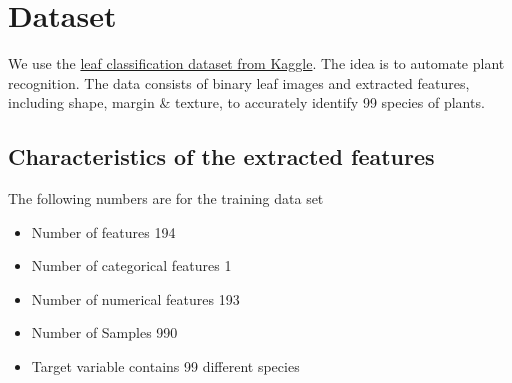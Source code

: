\documentclass{sig-alternate-05-2015}
\begin{document}
%
\author{
%
%
\alignauthor
Stefan Beyer\\
       \\
\alignauthor
Georg Heiler\\
       \\
}
\date{30 July 1999}

\maketitle

\section{Dataset}
We use the \href{https://www.kaggle.com/c/leaf-classification}{leaf classification dataset from Kaggle}. The idea is to automate plant recognition. The data consists of binary leaf images and extracted features, including shape, margin \& texture, to accurately identify 99 species of plants.

\subsection{Characteristics of the extracted features}
The following numbers are for the training data set

\begin{itemize}
  \item Number of features 194
  \item Number of categorical features 1
  \item Number of numerical features 193
  \item Number of Samples 990
  \item Target variable contains 99 different species
\end{itemize}
\end{document}
